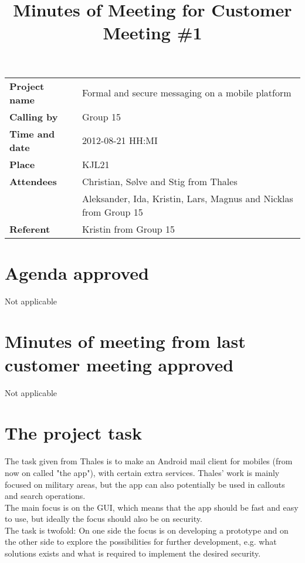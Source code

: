 \documentclass[a4paper,12pt]{article}
\begin{document}
\title{Minutes of Meeting for Customer Meeting \#1}
\maketitle
\begin{tabular}{>{\bfseries}l l}	
Project name&Formal and secure messaging on a mobile platform\\
Calling by&Group 15\\
Time and date&2012-08-21 HH:MI\\
Place&KJL21\\
Attendees&Christian, S{\o}lve and Stig from Thales\\
& Aleksander, Ida, Kristin, Lars, Magnus and Nicklas from Group 15 \\
Referent&Kristin from Group 15\\
\end{tabular}

\section{Agenda approved}
Not applicable
\section{Minutes of meeting from last customer meeting approved}
Not applicable
\section{The project task}
The task given from Thales is to make an Android mail client for mobiles (from now on called "the app"), with certain extra services. Thales' work is mainly focused on military areas, but the app can also potentially be used in callouts and search operations.\\
The main focus is on the GUI, which means that the app should be fast and easy to use, but ideally the focus should also be on security.\\
The task is twofold: On one side the focus is on developing a prototype and on the other side to explore the possibilities for further development, e.g. what solutions exists and what is required to implement the desired security.
\end{document}
